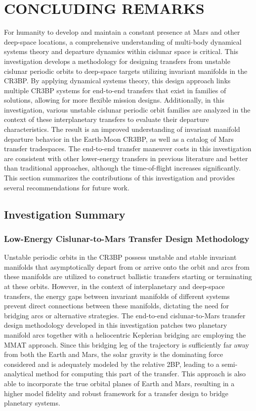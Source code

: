 \chapter{CONCLUDING REMARKS}
For humanity to develop and maintain a constant presence at Mars and other deep-space locations, a
comprehensive understanding of multi-body dynamical systems theory and departure dynamics within
cislunar space is critical. This investigation develops a methodology for designing transfers from
unstable cislunar periodic orbits to deep-space targets utilizing invariant manifolds in the CR3BP.
By applying dynamical systems theory, this design approach links multiple CR3BP systems for
end-to-end transfers that exist in families of solutions, allowing for more flexible mission
designs. Additionally, in this investigation, various unstable cislunar periodic orbit families are
analyzed in the context of these interplanetary transfers to evaluate their departure
characteristics. The result is an improved understanding of invariant manifold departure behavior
in the Earth-Moon CR3BP, as well as a catalog of Mars transfer tradespaces. The end-to-end transfer
maneuver costs in this investigation are consistent with other lower-energy transfers in previous
literature and better than traditional approaches, although the time-of-flight increases
significantly. This section summarizes the contributions of this investigation and provides
several recommendations for future work.

\section{Investigation Summary}
\subsection{Low-Energy Cislunar-to-Mars Transfer Design Methodology}
Unstable periodic orbits in the CR3BP possess unstable and stable invariant manifolds that
asymptotically depart from or arrive onto the orbit and arcs from these manifolds are utilized to
construct ballistic transfers starting or terminating at these orbits. However, in the context of
interplanetary and deep-space transfers, the energy gaps between invariant manifolds of different
systems prevent direct connections between these manifolds, dictating the need for bridging arcs
or alternative strategies. The end-to-end cislunar-to-Mars transfer design methodology developed in
this investigation patches two planetary manifold arcs together with a heliocentric Keplerian
bridging arc employing the MMAT approach. Since this bridging leg of the trajectory is sufficiently
far away from both the Earth and Mars, the solar gravity is the dominating force considered and is
adequately modeled by the relative 2BP, leading to a semi-analytical method for computing this part
of the transfer. This approach is also able to incorporate the true orbital planes of Earth and
Mars, resulting in a higher model fidelity and robust framework for a transfer design to bridge
planetary systems. 

